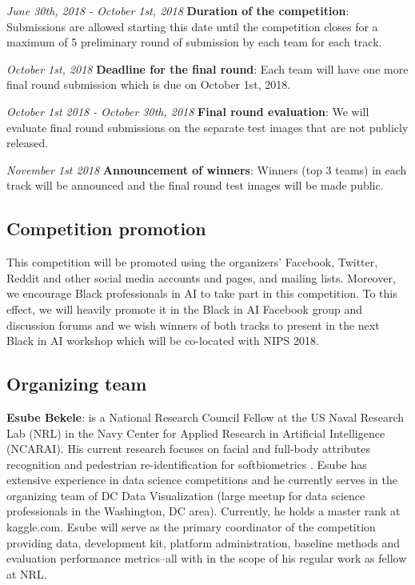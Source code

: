 \documentclass[11pt, oneside]{article}
\makeatletter
\let\@internalcite\cite
\def\cite{\def\citeauthoryear##1##2{##1, ##2}\@internalcite}
\makeatother
\begin{document}
{\it June 30th, 2018 - October 1st, 2018} {\bf Duration of the competition}: 
Submissions are allowed starting this date until the competition closes for a 
maximum of 5 preliminary round of submission by each team for each track.

{\it October 1st, 2018} {\bf Deadline for the final round}: Each team will have 
one more final round submission which is due on October 1st, 2018.

{\it October 1st 2018 - October 30th, 2018} {\bf Final round evaluation}: We 
will evaluate final round submissions on the separate test images that are not 
publicly released.

{\it November 1st 2018} {\bf Announcement of winners}: Winners (top 3 teams) in 
each track will be announced and the final round test images will be made 
public.

\subsection{Competition promotion}

This competition will be promoted using the organizers' Facebook, Twitter, 
Reddit and other social media accounts and pages, and mailing lists. Moreover, 
we encourage Black professionals in AI to take part in this competition. To 
this effect, we will heavily promote it in the Black in AI Facebook group and 
discussion forums and we wish winners of both tracks to present in the next 
Black in AI workshop which will be co-located with NIPS 2018.

\subsection{Organizing team}

{\bf Esube Bekele}: is a National Research Council Fellow at the US Naval
Research Lab (NRL) in the Navy Center for Applied Research in Artificial
Intelligence (NCARAI). His current research focuses on facial and full-body 
attributes recognition and pedestrian re-identification for softbiometrics 
\cite{bekele2017multi}. Esube has extensive experience in data science  
competitions and he currently serves in the organizing team of DC Data 
Visualization (large meetup for data science professionals in the Washington, 
DC area). Currently, he holds a master rank at kaggle.com. Esube will serve as 
the primary coordinator of the competition providing data, development kit, 
platform administration, baseline methods and evaluation performance 
metrics--all with in the scope of his regular work as fellow at NRL.
\end{document}
